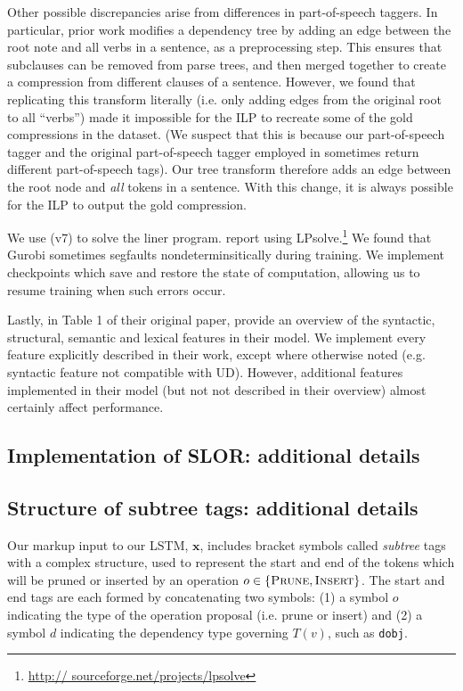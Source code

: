 Other possible discrepancies arise from differences in part-of-speech taggers. In particular, prior work modifies a dependency tree by adding an edge between the root note and all verbs in a sentence, as a preprocessing step. This ensures that subclauses can be removed from parse trees, and then merged together to create a compression from different clauses of a sentence. However, we found that replicating this transform literally (i.e. only adding edges from the original root to all ``verbs'') made it impossible for the ILP to recreate some of the gold compressions in the dataset. (We suspect that this is because our part-of-speech tagger and the original part-of-speech tagger employed in \citet{filippova2013overcoming} sometimes return different part-of-speech tags). Our tree transform therefore adds an edge between the root node and \textit{all} tokens in a sentence. With this change, it is always possible for the ILP to output the gold compression.

We use \citet{gurobi} (v7) to solve the liner program. \citet{filippova2008dependency} report using LPsolve.\footnote{\url{http://
sourceforge.net/projects/lpsolve}}  We found that Gurobi sometimes segfaults nondeterminsitically during training. We implement checkpoints which save and restore the state of computation, allowing us to resume training when such errors occur. 

Lastly, in Table 1 of their original paper, \citet{filippova2013overcoming} provide an overview of the syntactic, structural, semantic and lexical features in their model. We implement every feature explicitly described in their work, except where otherwise noted (e.g. syntactic feature not compatible with UD). However, additional features implemented in their model (but not not described in their overview) almost certainly affect performance. 


\subsection{Implementation of SLOR: additional details}

\subsection{Structure of subtree tags: additional details}\label{s:subtree}

Our markup input to our LSTM, $\bm{x}$, includes bracket symbols called \textit{subtree} tags with a complex structure, used to represent the start and end of the tokens which will be pruned or inserted by an operation $o \in \{ \textsc{Prune},\textsc{Insert}\}$. The start and end tags are each formed by concatenating two symbols: (1) a symbol $o$ indicating the type of the operation proposal (i.e. prune or insert) and (2) a symbol $d$ indicating the dependency type governing $T(v)$, such as \texttt{dobj}. 

